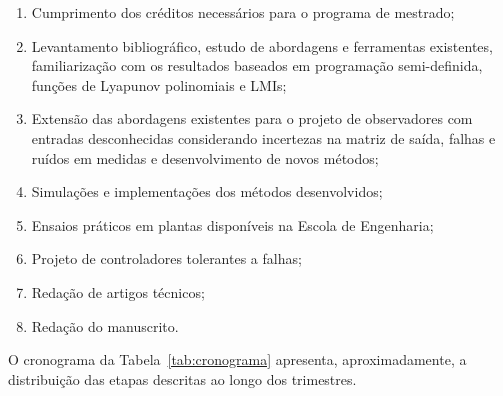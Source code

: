 \documentclass[11pt,a4paper]{article}
\begin{document}
\begin{enumerate}[label=\textbf{\alph*)}]
\item Cumprimento dos créditos necessários para o programa de
  mestrado;
  
\item Levantamento bibliográfico, estudo de abordagens e ferramentas
  existentes, familiarização com os resultados baseados em programação
  semi-definida, funções de Lyapunov polinomiais e LMIs;
  
\item Extensão das abordagens existentes para o projeto de
  observadores com entradas desconhecidas considerando incertezas na
  matriz de saída, falhas e ruídos em medidas e desenvolvimento de
  novos métodos;
  
\item Simulações e implementações dos métodos desenvolvidos;
  
\item Ensaios práticos em plantas disponíveis na Escola de Engenharia;

\item Projeto de controladores tolerantes a falhas;
  
\item Redação de artigos técnicos;

\item Redação do manuscrito.
\end{enumerate}

O cronograma da Tabela~\ref{tab:cronograma} apresenta,
aproximadamente, a distribuição das etapas descritas ao longo dos
trimestres.
\end{document}
